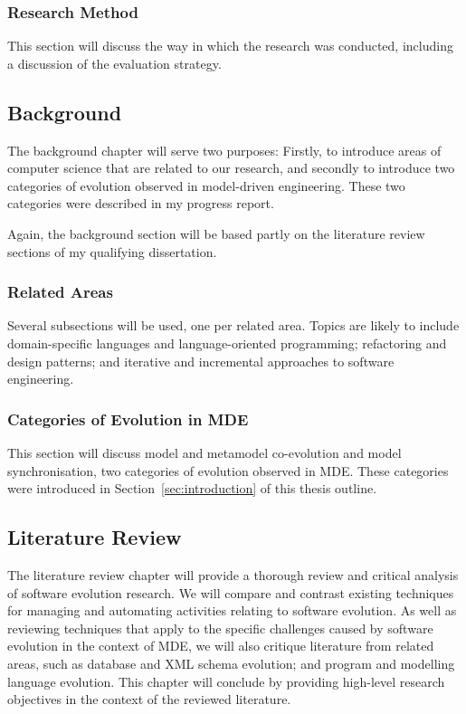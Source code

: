 \subsubsection{Research Method}
This section will discuss the way in which the research was conducted, including a discussion of the evaluation strategy.


\subsection{Background}
The background chapter will serve two purposes: Firstly, to introduce areas of computer science that are related to our research, and secondly to introduce two categories of evolution observed in model-driven engineering. These two categories were described in my progress report.

Again, the background section will be based partly on the literature review sections of my qualifying dissertation.

\subsubsection{Related Areas}
Several subsections will be used, one per related area. Topics are likely to include domain-specific languages and language-oriented programming; refactoring and design patterns; and iterative and incremental approaches to software engineering.

\subsubsection{Categories of Evolution in MDE}
This section will discuss model and metamodel co-evolution and model synchronisation, two categories of evolution observed in MDE. These categories were introduced in Section~\ref{sec:introduction} of this thesis outline.


\subsection{Literature Review}
The literature review chapter will provide a thorough review and critical analysis of software evolution research. We will compare and contrast existing techniques for managing and automating activities relating to software evolution. As well as reviewing techniques that apply to the specific challenges caused by software evolution in the context of MDE, we will also critique literature from related areas, such as database and XML schema evolution; and program and modelling language evolution. This chapter will conclude by providing high-level research objectives in the context of the reviewed literature.



